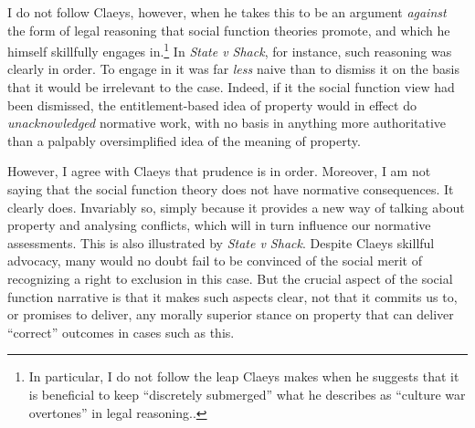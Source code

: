 \documentclass[12pt,a4paper]{book} %
\begin{document}
I do not follow Claeys, however, when he takes this to be an argument {\it against} the form of legal reasoning that social function theories promote, and which he himself skillfully engages in.\footnote{In particular, I do not follow the leap Claeys makes when he suggests that it is beneficial to keep ``discretely submerged'' what he describes as ``culture war overtones'' in legal reasoning.\cite[947]{claeys09}.} In {\it State v Shack}, for instance, such reasoning was clearly in order. To engage in it was far {\it less} naive than to dismiss it on the basis that it would be irrelevant to the case. Indeed, if it the social function view had been dismissed, the entitlement-based idea of property would in effect do {\it unacknowledged} normative work, with no basis in anything more authoritative than a palpably oversimplified idea of the meaning of property. 

However, I agree with Claeys that prudence is in order. Moreover, I am not saying that the social function theory does not have normative consequences. It clearly does. Invariably so, simply because it provides a new way of talking about property and analysing conflicts, which will in turn influence our normative assessments. This is also illustrated by {\it State v Shack}. Despite Claeys skillful advocacy, many would no doubt fail to be convinced of the social merit of recognizing a right to exclusion in this case. But the crucial aspect of the social function narrative is that it makes such aspects clear, not that it commits us to, or promises to deliver, any morally superior stance on property that can deliver ``correct'' outcomes in cases such as this.
\end{document}
